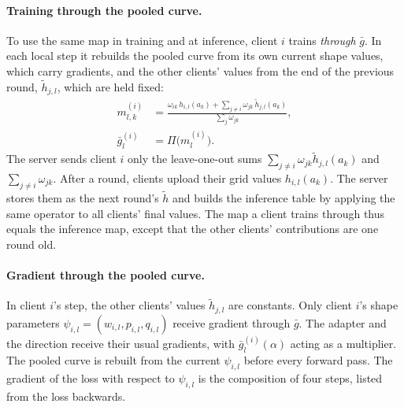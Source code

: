 \documentclass[11pt]{article}
\begin{document}
\paragraph{Training through the pooled curve.}
To use the same map in training and at inference, client $i$ trains \emph{through} $\bar g$.
In each local step it rebuilds the pooled curve from its own current shape values, which carry gradients, and the other clients' values from the end of the previous round, $\tilde h_{j,l}$, which are held fixed:
\begin{align}
  m^{(i)}_{l,k} &= \frac{\omega_{ik}\, h_{i,l}(a_k) + \sum_{j\neq i} \omega_{jk}\, \tilde h_{j,l}(a_k)}{\sum_{j} \omega_{jk}}, \\
  \bar g^{(i)}_l &= \Pi\bigl(m^{(i)}_l\bigr).
\end{align}
The server sends client $i$ only the leave-one-out sums $\sum_{j\neq i} \omega_{jk}\tilde h_{j,l}(a_k)$ and $\sum_{j\neq i} \omega_{jk}$.
After a round, clients upload their grid values $h_{i,l}(a_k)$.
The server stores them as the next round's $\tilde h$ and builds the inference table by applying the same operator to all clients' final values.
The map a client trains through thus equals the inference map, except that the other clients' contributions are one round old.

\paragraph{Gradient through the pooled curve.}
In client $i$'s step, the other clients' values $\tilde h_{j,l}$ are constants.
Only client $i$'s shape parameters $\psi_{i,l}=(w_{i,l},p_{i,l},q_{i,l})$ receive gradient through $\bar g$.
The adapter and the direction receive their usual gradients, with $\bar g^{(i)}_l(\alpha)$ acting as a multiplier.
The pooled curve is rebuilt from the current $\psi_{i,l}$ before every forward pass.
The gradient of the loss with respect to $\psi_{i,l}$ is the composition of four steps, listed from the loss backwards.
\end{document}
